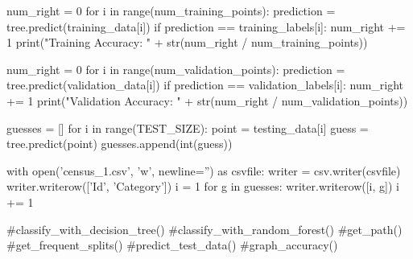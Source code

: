 \documentclass{article}
\begin{document}
\begin{python}
    num_right = 0
    for i in range(num_training_points):
        prediction = tree.predict(training_data[i])
        if prediction == training_labels[i]:
            num_right += 1
    print("Training Accuracy: " + str(num_right / num_training_points))

    num_right = 0
    for i in range(num_validation_points):
        prediction = tree.predict(validation_data[i])
        if prediction == validation_labels[i]:
            num_right += 1
    print("Validation Accuracy: " + str(num_right / num_validation_points))

    guesses = []
    for i in range(TEST_SIZE):
        point = testing_data[i]
        guess = tree.predict(point)
        guesses.append(int(guess))

    with open('census_1.csv', 'w', newline='') as csvfile:
        writer = csv.writer(csvfile)
        writer.writerow(['Id', 'Category'])
        i = 1
        for g in guesses:
            writer.writerow([i, g])
            i += 1


#classify_with_decision_tree()
#classify_with_random_forest()
#get_path()
#get_frequent_splits()
#predict_test_data()
#graph_accuracy()
\end{python}
\end{document}
